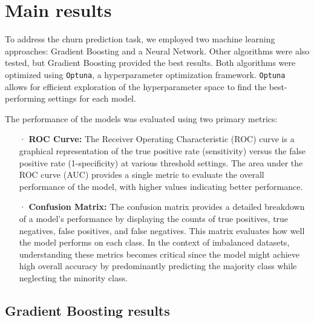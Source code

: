 \documentclass[12pt]{article}
\begin{document}
\section{Main results}
To address the churn prediction task, we employed two machine learning approaches: Gradient Boosting and a Neural Network. Other algorithms were also tested, but Gradient Boosting provided the best results. Both algorithms were optimized using \texttt{Optuna}, a hyperparameter optimization framework. \texttt{Optuna} allows for efficient exploration of the hyperparameter space to find the best-performing settings for each model.

The performance of the models was evaluated using two primary metrics:
\begin{itemize}
    \item[·] \textbf{ROC Curve:} The Receiver Operating Characteristic (ROC) curve is a graphical representation of the true positive rate (sensitivity) versus the false positive rate (1-specificity) at various threshold settings. The area under the ROC curve (AUC) provides a single metric to evaluate the overall performance of the model, with higher values indicating better performance.
    \item[·] \textbf{Confusion Matrix:} The confusion matrix provides a detailed breakdown of a model's performance by displaying the counts of true positives, true negatives, false positives, and false negatives. This matrix evaluates how well the model performs on each class. In the context of imbalanced datasets, understanding these metrics becomes critical since the model might achieve high overall accuracy by predominantly predicting the majority class while neglecting the minority class. 
\end{itemize}

\subsection{Gradient Boosting results}
\end{document}
